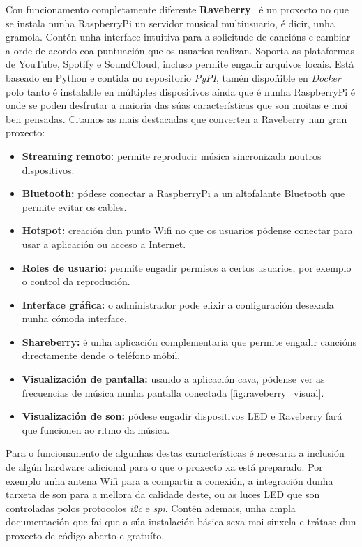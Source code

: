 Con funcionamento completamente diferente \textbf{Raveberry}~\cite{raveberry} é un proxecto no que se instala nunha RaspberryPi un servidor musical multiusuario, é dicir, unha gramola. Contén unha interface intuitiva para a solicitude de cancións e cambiar a orde de acordo coa puntuación que os usuarios realizan. Soporta as plataformas de YouTube, Spotify e SoundCloud, incluso permite engadir arquivos locais. Está baseado en Python e contida no repositorio \textit{PyPI}, tamén dispoñible en \textit{Docker} polo tanto é instalable en múltiples dispositivos aínda que é nunha RaspberryPi é onde se poden desfrutar a maioría das súas características que son moitas e moi ben pensadas. Citamos as mais destacadas que converten a Raveberry nun gran proxecto:
\begin{itemize}
	\item \textbf{Streaming remoto:} permite reproducir música sincronizada noutros dispositivos.
	\item \textbf{Bluetooth:} pódese conectar a RaspberryPi a un altofalante Bluetooth que permite evitar os cables.
	\item \textbf{Hotspot:} creación dun punto Wifi no que os usuarios pódense conectar para usar a aplicación ou acceso a Internet.
	\item \textbf{Roles de usuario:} permite engadir permisos a certos usuarios, por exemplo o control da reprodución.
	\item \textbf{Interface gráfica:} o administrador pode elixir a configuración desexada nunha cómoda interface.
	\item \textbf{Shareberry:} é unha aplicación complementaria que permite engadir cancións directamente dende o teléfono móbil.
	\item \textbf{Visualización de pantalla:} usando a aplicación cava, pódense ver as frecuencias de música nunha pantalla conectada \ref{fig:raveberry_visual}.
	\item \textbf{Visualización de son:} pódese engadir dispositivos LED e Raveberry fará que funcionen ao ritmo da música.
\end{itemize}
Para o funcionamento de algunhas destas características é necesaria a inclusión de algún hardware adicional para o que o proxecto xa está preparado. Por exemplo unha antena Wifi para a compartir a conexión, a integración dunha tarxeta de son para a mellora da calidade deste, ou as luces LED que son controladas polos protocolos \textit{i2c} e \textit{spi}. Contén ademais, unha ampla documentación que fai que a súa instalación básica sexa moi sinxela e trátase dun proxecto de código aberto e gratuíto.

